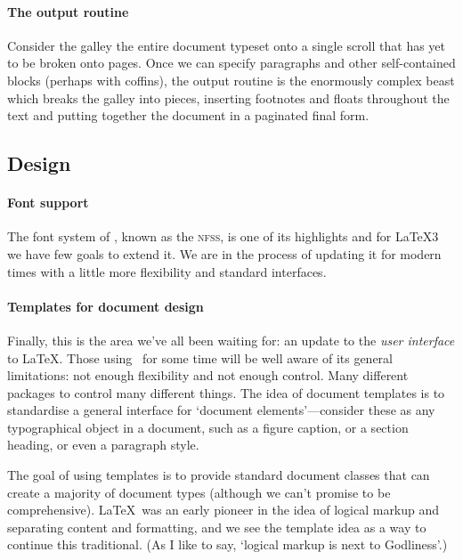 \documentclass{ltnews}
\providecommand\acro[1]{\textsc{\MakeLowercase{#1}}}
\begin{document}
\paragraph{The output routine}

Consider the galley the entire document typeset onto a single scroll that has yet to be broken onto pages.
Once we can specify paragraphs and other self-contained blocks (perhaps with coffins), the output routine is the enormously complex beast which breaks the galley into pieces, inserting footnotes and floats throughout the text and putting together the document in a paginated final form.

\subsection{Design}

\paragraph{Font support}

The font system of \LaTeXe, known as the \acro{NFSS}, is one of its highlights and for \LaTeX3 we have few goals to extend it.
We are in the process of updating it for modern times with a little more flexibility and standard interfaces.

\paragraph{Templates for document design}

Finally, this is the area we've all been waiting for: an update to the \emph{user interface} to \LaTeX.
Those using \LaTeXe\ for some time will be well aware of its general limitations: not enough flexibility and not enough control.
Many different packages to control many different things.
The idea of document templates is to standardise a general interface for `document elements'---consider these as any typographical object in a document, such as a figure caption, or a section heading, or even a paragraph style.

The goal of using templates is to provide standard document classes that can create a majority of document types (although we can't promise to be comprehensive).
\LaTeX\ was an early pioneer in the idea of logical markup and separating content and formatting, and we see the template idea as a way to continue this traditional.
(As I like to say, `logical markup is next to Godliness'.)
\end{document}
